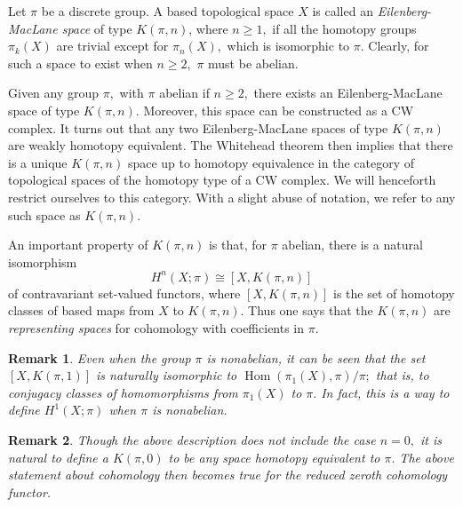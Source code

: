 \documentclass[12pt]{article}
\newcommand{\funcsig}[2]{#1\rightarrow #2}
\newcommand{\funcdef}[3]{#1:\funcsig{#2}{#3}}
\newtheorem{rmk}{Remark}
\newcommand{\isom}{\cong}
\renewcommand{\hom}{\mathop{\mathrm{Hom}}} %
\begin{document}

Let $\pi$ be a discrete group. A based topological space $X$ is called an {\em Eilenberg-MacLane space\/} of type $K(\pi,n)$, where $n\ge 1,$  if all the homotopy groups $\pi_k(X)$ are trivial except for $\pi_n(X),$ which is isomorphic to $\pi.$ Clearly, for such a space to exist when $n\ge 2,$ $\pi$ must be abelian.

Given any group $\pi,$ with $\pi$ abelian if $n\ge 2,$ there exists an Eilenberg-MacLane space of type $K(\pi,n).$ Moreover, this space can be constructed as a CW complex. It turns out that any two Eilenberg-MacLane spaces of type $K(\pi,n)$ are weakly homotopy equivalent. The Whitehead theorem then implies that there is a unique $K(\pi,n)$ space up to homotopy equivalence in the category of topological spaces of the homotopy type of a CW complex. We will henceforth restrict ourselves to this category. With a slight abuse of notation, we refer to any such space as $K(\pi,n).$

An important property of $K(\pi,n)$ is that, for $\pi$ abelian, 
there is a natural isomorphism
\[
H^n(X;\pi) \isom [X,K(\pi,n)]
\]
of contravariant set-valued functors, where $[X,K(\pi,n)]$ is the set of homotopy classes of based maps from $X$ to $K(\pi,n).$ Thus one says that the $K(\pi,n)$ are {\em representing spaces\/} for cohomology with coefficients in $\pi.$

\begin{rmk}
Even when the group $\pi$ is nonabelian, it can be seen that the set 
$[X,K(\pi,1)]$ is naturally isomorphic to $\hom(\pi_1(X),\pi)/\pi;$ that is,
to conjugacy classes of homomorphisms from $\pi_1(X)$ to $\pi.$ In fact, this
is a way to define $H^1(X;\pi)$ when $\pi$ is nonabelian.
\end{rmk}

\begin{rmk}
Though the above description does not include the case $n=0,$ it is natural to define a $K(\pi,0)$ to be any space homotopy equivalent to $\pi.$ The above statement about cohomology then becomes true for the reduced zeroth cohomology functor.
\end{rmk}


%
\end{document}
